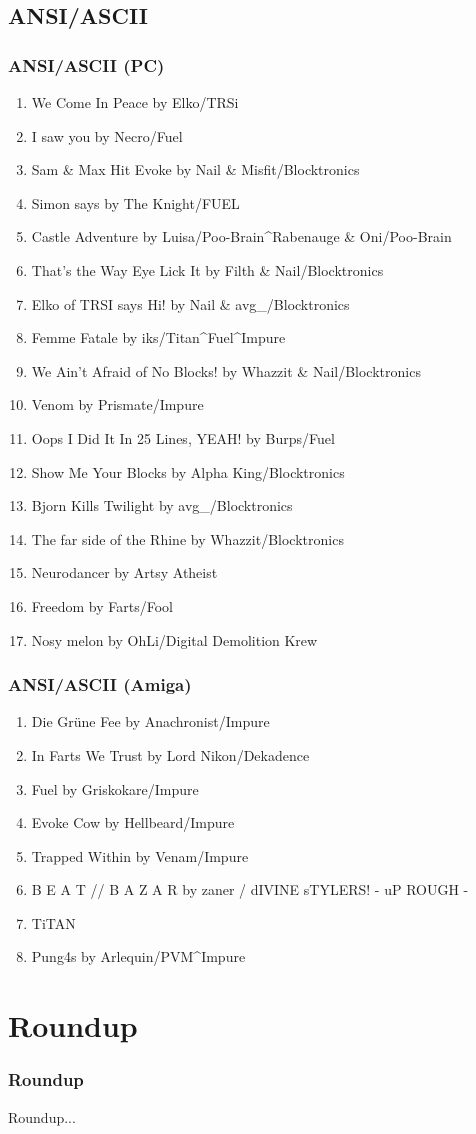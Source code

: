 \documentclass{beamer}
\begin{document}
\subsection{ANSI/ASCII}
\begin{frame}
  \frametitle{ANSI/ASCII (PC)}
  {\tiny\begin{enumerate}
  \item We Come In Peace by Elko/TRSi
  \item I saw you by Necro/Fuel
  \item Sam \& Max Hit Evoke by Nail \& Misfit/Blocktronics 
  \item Simon says by The Knight/FUEL
  \item Castle Adventure by Luisa/Poo-Brain\^{}Rabenauge \& Oni/Poo-Brain
  \item That's the Way Eye Lick It by Filth \& Nail/Blocktronics 
  \item Elko of TRSI says Hi! by Nail \& avg\_/Blocktronics 
  \item Femme Fatale by iks/Titan\^{}Fuel\^{}Impure
  \item We Ain't Afraid of No Blocks!  by Whazzit \& Nail/Blocktronics
  \item Venom by Prismate/Impure 
  \item Oops I Did It In 25 Lines, YEAH! by Burps/Fuel 
  \item Show Me Your Blocks by Alpha King/Blocktronics 
  \item Bjorn Kills Twilight by avg\_/Blocktronics 
  \item The far side of the Rhine by Whazzit/Blocktronics 
  \item Neurodancer by Artsy Atheist 
  \item Freedom by Farts/Fool 
  \item Nosy melon by OhLi/Digital Demolition Krew
  \end{enumerate}}
\end{frame}

\begin{frame}
  \frametitle{ANSI/ASCII (Amiga)}
  \begin{enumerate}
  \item Die Grüne Fee by Anachronist/Impure 
  \item In Farts We Trust by Lord Nikon/Dekadence 
  \item Fuel by Griskokare/Impure 
  \item Evoke Cow by Hellbeard/Impure 
  \item Trapped Within by Venam/Impure 
  \item B E A T // B A Z A R by zaner / dIVINE sTYLERS! - uP ROUGH -
  \item TiTAN
  \item Pung4s by Arlequin/PVM\^{}Impure 
  \end{enumerate}
\end{frame}


\section{Roundup}
\begin{frame}
  \frametitle{Roundup}
  Roundup...
\end{frame}
\end{document}
